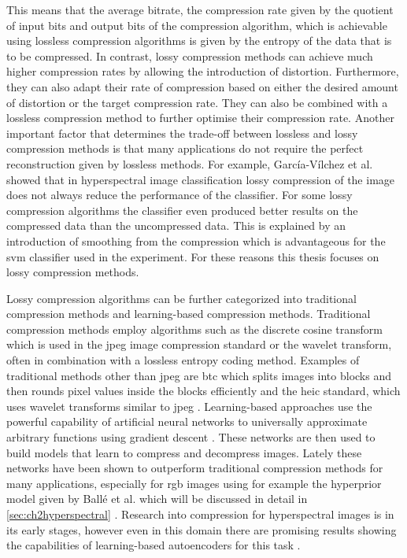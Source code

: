 This means that the average bitrate, the compression rate given by the quotient of input bits and output bits of the compression algorithm, which is achievable using lossless compression algorithms is given by the entropy of the data that is to be compressed.
In contrast, lossy compression methods can achieve much higher compression rates by allowing the introduction of distortion. Furthermore, they can also adapt their rate of compression based on either the desired amount of distortion or the target compression rate. They can also be combined with a lossless compression method to further optimise their compression rate. 
Another important factor that determines the trade-off between lossless and lossy compression methods is that many applications do not require the perfect reconstruction given by lossless methods. For example, García-Vílchez et al. \citep{garcia-vilchez_impact_2011} showed that in hyperspectral image classification lossy compression of the image does not always reduce the performance of the classifier. For some lossy compression algorithms the classifier even produced better results on the compressed data than the uncompressed data. This is explained by an introduction of smoothing from the compression which is advantageous for the \ac{svm} classifier used in the experiment. 
For these reasons this thesis focuses on lossy compression methods.

Lossy compression algorithms can be further categorized into traditional compression methods and learning-based compression methods. Traditional compression methods employ algorithms such as the discrete cosine transform which is used in the \ac{jpeg} image compression standard or the wavelet transform, often in combination with a lossless entropy coding method. Examples of traditional methods other than \ac{jpeg} are \ac{btc} which splits images into blocks and then rounds pixel values inside the blocks efficiently and the \ac{heic} standard, which uses wavelet transforms similar to \ac{jpeg} \citep{delp_image_1979,hannuksela_high_2015}. Learning-based approaches use the powerful capability of artificial neural networks to universally approximate arbitrary functions using gradient descent \citep{ruder_overview_2017}. These networks are then used to build models that learn to compress and decompress images. Lately these networks have been shown to outperform traditional compression methods for many applications, especially for \ac{rgb} images using for example the hyperprior model given by Ballé et al. which will be discussed in detail in \autoref{sec:ch2hyperspectral} \citep{balle_end--end_2017,balle_variational_2018,minnen_joint_2018}. 
Research into compression for hyperspectral images is in its early stages, however even in this domain there are promising results showing the capabilities of learning-based autoencoders for this task \citep{kuester_1d-convolutional_2021,kuester_transferability_2022,la_grassa_hyperspectral_2022,guo_learned_2021}.

